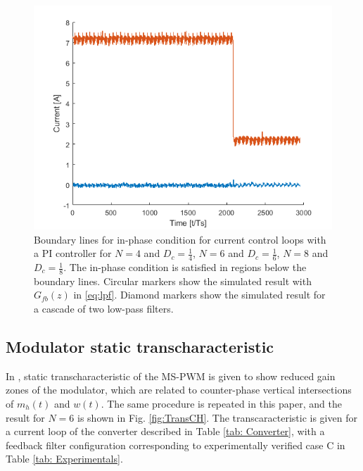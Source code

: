 \documentclass[journal]{IEEEtran}
\begin{document}
\begin{figure}[t!]
    \centerline{\includegraphics[width=0.95\linewidth]{figures/nasb_step.png}}
    \caption{Boundary lines for in-phase condition for current control loops with a PI controller for $N = 4$ and $D_c = \frac{1}{4}$, $N = 6$ and $D_c = \frac{1}{6}$, $N = 8$ and $D_c = \frac{1}{8}$. The in-phase condition is satisfied in regions below the boundary lines. Circular markers show the simulated result with $G_{fb}(z)$ in \eqref{eq:lpf}. Diamond markers show the simulated result for a cascade of two low-pass filters.}
    \label{fig:PIInPhaseCondition}
\end{figure}

\subsection{Modulator static transcharacteristic}
In , static transcharacteristic of the MS-PWM is given to show reduced gain zones of the modulator, which are related to counter-phase vertical intersections of $m_h(t)$ and $w(t)$. The same procedure is repeated in this paper, and the result for $N=6$ is shown in Fig. \ref{fig:TransCH}. The transcaracteristic is given for a current loop of the converter described in Table \ref{tab: Converter}, with a feedback filter configuration corresponding to experimentally verified case C in Table \ref{tab: Experimentals}.
\end{document}
